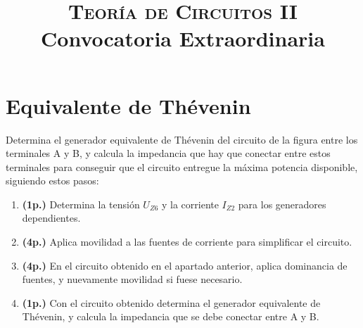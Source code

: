 \documentclass[12pt]{article}
\begin{document}
\title{\textsc{Teoría de Circuitos II} \\ Convocatoria Extraordinaria}

\date{}

\maketitle

\section*{Equivalente de Thévenin}
Determina el generador equivalente de Thévenin del circuito de la figura entre los terminales A y B, y calcula la impedancia que hay que conectar entre estos terminales para conseguir que el circuito entregue la máxima potencia disponible, siguiendo estos pasos:

\begin{enumerate}
\item \textbf{(1p.)} Determina la tensión $U_{Z6}$ y la corriente $I_{Z2}$ para los generadores dependientes.
\item \textbf{(4p.)} Aplica movilidad a las fuentes de corriente para simplificar el circuito.
\item \textbf{(4p.)} En el circuito obtenido en el apartado anterior, aplica dominancia de fuentes, y nuevamente movilidad si fuese necesario.
\item \textbf{(1p.)} Con el circuito obtenido determina el generador equivalente de Thévenin, y calcula la impedancia que se debe conectar entre A y B.
\end{enumerate}
\end{document}
